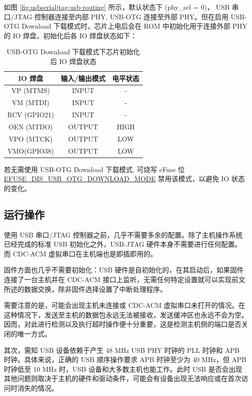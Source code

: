 \documentclass[main\_\_CN.tex]{subfiles}
\begin{document}
如图 \ref{fig:usbserialjtag-usb-routing} 所示，默认状态下 (phy\_sel = 0)，\chipseries{} USB 串口/JTAG 控制器连接至内部 PHY, USB-OTG 连接至外部 PHY。但在启用 USB-OTG Download 下载模式时，芯片上电后会在 ROM 中初始化用于连接外部 PHY 的 IO 焊盘，初始化后各 IO 焊盘状态如下：

\begin{table}[H]
    \centering
    \caption{USB-OTG Download 下载模式下芯片初始化后 IO 焊盘状态}
    \label{tab:io-pad-state-in-usb-otg-download-mode}
    \begin{tabular}{|c|c|c|}
    \hline
       \rowcolor{lightgray}
       \textbf{IO 焊盘} & \textbf{输入/输出模式} & \textbf{电平状态}  \\\hline
        VP (MTMS) & INPUT & - \\\hline
        VM (MTDI) & INPUT & - \\\hline
        RCV (GPIO21) & INPUT & - \\\hline
        OEN (MTDO) & OUTPUT & HIGH \\\hline
        VPO (MTCK) & OUTPUT & LOW \\\hline
        VMO(GPIO38) & OUTPUT & LOW \\\hline
    \end{tabular}
\end{table}

若无需使用 USB-OTG Download 下载模式, 可烧写 eFuse 位 \hyperref[fielddesc:EFUSEDISUSBOTGDOWNLOADMODE]{EFUSE\_DIS\_USB\_OTG\_DOWNLOAD\_MODE} 禁用该模式，以避免 IO 状态的变化。


\subsection{运行操作}

使用 USB 串口/JTAG 控制器之前，几乎不需要多余的配置。除了主机操作系统已经完成的标准 USB 初始化之外，USB-JTAG 硬件本身不需要进行任何配置。而 CDC-ACM 虚拟串口在主机端也是即插即用的。

固件方面也几乎不需要初始化：USB 硬件是自初始化的，在其启动后，如果固件连接了一台主机并在 CDC-ACM 接口上监听，无需任何特定设置就可以实现前文所述的数据交换，除非固件选择设置了中断处理程序。

需要注意的是，可能会出现主机未连接或 CDC-ACM 虚拟串口未打开的情况。在这种情况下，发送至主机的数据包永远无法被接收，发送缓冲区也永远不会为空。因而，对此进行检测以及执行超时操作便十分重要，这是检测主机侧的端口是否关闭的唯一方式。

其次，需知 USB 设备依赖于产生 48 MHz USB PHY 时钟的 PLL 时钟和 APB 时钟。具体来说，正确的 USB 顺序操作要求 APB 时钟至少为 40 MHz，但 APB 时钟低至 10 MHz 时，USB 设备和大多数主机也能工作。此时 USB 是否会出现其他问题则取决于主机的硬件和驱动条件，可能会有设备出现无法响应或在首次访问时消失的情况。
\end{document}
